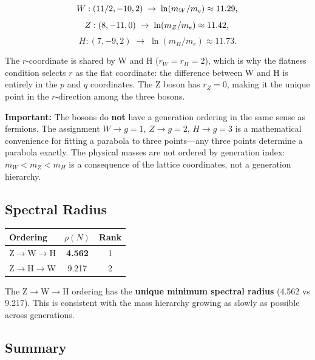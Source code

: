 \begin{equation}
W: (11/2, -10, 2) \;\to\; \ln(m_W/m_e) \approx 11.29, \newline \\
\end{equation}
\begin{equation}
Z: (8, -11, 0) \;\to\; \ln(m_Z/m_e) \approx 11.42, \newline \\
\end{equation}
\begin{equation}
H: (7, -9, 2) \;\to\; \ln(m_H/m_e) \approx 11.73.
\end{equation}

The $r$-coordinate is shared by W and H ($r_W = r_H = 2$), which is why the flatness condition selects $r$ as the flat coordinate: the difference between W and H is entirely in the $p$ and $q$ coordinates. The Z boson has $r_Z = 0$, making it the unique point in the $r$-direction among the three bosons.

\textbf{Important:} The bosons do \textbf{not} have a generation ordering in the same sense as fermions. The assignment $W \to g=1$, $Z \to g=2$, $H \to g=3$ is a mathematical convenience for fitting a parabola to three points---any three points determine a parabola exactly. The physical masses are not ordered by generation index: $m_W < m_Z < m_H$ is a consequence of the lattice coordinates, not a generation hierarchy.

\subsection{Spectral Radius}\label{app:boson_spectral}

\begin{center}
\label{tab:boson_spectral}
\begin{tabular}{lcc}
\hline\hline
Ordering & $\rho(N)$ & Rank \\
\hline
Z$\to$W$\to$H & \textbf{4.562} & 1 \\
Z$\to$H$\to$W & 9.217 & 2 \\
\hline\hline
\end{tabular}
\end{center}

The Z$\to$W$\to$H ordering has the \textbf{unique minimum spectral radius} (4.562 vs 9.217). This is consistent with the mass hierarchy growing as slowly as possible across generations.

\subsection{Summary}\label{app:boson_summary}

